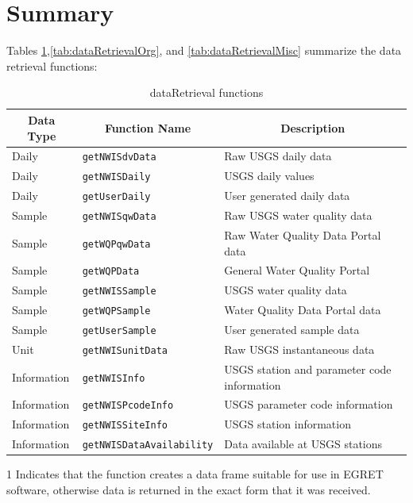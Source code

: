 \documentclass[a4paper,11pt]{article}\usepackage[]{graphicx}\usepackage[]{color}
\begin{document}
\FloatBarrier
\clearpage


\section{Summary}
\label{sec:summary}

Tables \ref{tab:dataRetrievalFunctions1},\ref{tab:dataRetrievalOrg}, and \ref{tab:dataRetrievalMisc} summarize the data retrieval functions:

\begin{table}
{\footnotesize
  \begin{threeparttable}[b]
  \caption{dataRetrieval functions}
  \label{tab:dataRetrievalFunctions1}
\begin{tabular}{lll}
  \hline
\multicolumn{1}{c}{\textbf{\textsf{Data Type}}} &
\multicolumn{1}{c}{\textbf{\textsf{Function Name}}} &
\multicolumn{1}{c}{\textbf{\textsf{Description}}} \\ [0pt]
  \hline
  Daily & \texttt{getNWISdvData} & Raw USGS daily data \\ 
  [5pt]Daily\tnote{1} & \texttt{getNWISDaily} & USGS daily values \\ 
  [5pt]Daily\tnote{1} & \texttt{getUserDaily} & User generated daily data \\ 
  [5pt]Sample & \texttt{getNWISqwData} & Raw USGS water quality data \\
  [5pt]Sample & \texttt{getWQPqwData} & Raw Water Quality Data Portal data \\ 
  [5pt]Sample & \texttt{getWQPData} & General Water Quality Portal\\
  [5pt]Sample\tnote{1} & \texttt{getNWISSample} & USGS water quality data\\
  [5pt]Sample\tnote{1} & \texttt{getWQPSample} & Water Quality Data Portal data \\
  [5pt]Sample\tnote{1} & \texttt{getUserSample} & User generated sample data \\ 
  [5pt]Unit & \texttt{getNWISunitData} & Raw USGS instantaneous data \\
  [5pt]Information\tnote{1} & \texttt{getNWISInfo} & USGS station and parameter code information \\ 
  [5pt]Information & \texttt{getNWISPcodeInfo} & USGS parameter code information \\ 
  [5pt]Information & \texttt{getNWISSiteInfo} & USGS station information \\ 
  [5pt]Information & \texttt{getNWISDataAvailability} & Data available at USGS stations \\ 
   \hline
\end{tabular}

  \begin{tablenotes}
    \item[1] Indicates that the function creates a data frame suitable for use in EGRET software, otherwise data is returned in the exact form that it was received.
  \end{tablenotes}
 \end{threeparttable}
}
\end{table}
\end{document}

